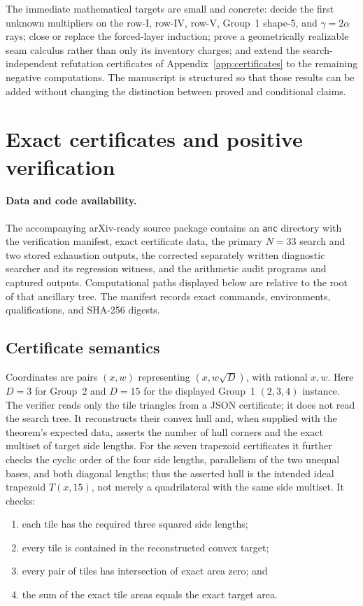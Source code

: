\documentclass[11pt]{amsart}
\theoremstyle{definition}
\theoremstyle{remark}
\newcommand{\pathcode}[1]{\nolinkurl{#1}}
\begin{document}
The immediate mathematical targets are small and concrete: decide the first
unknown multipliers on the row-I, row-IV, row-V, Group~1 shape-5, and
$\gamma=2\alpha$ rays; close or replace the forced-layer induction; prove a
geometrically realizable seam calculus rather than only its inventory
charges; and extend the search-independent refutation certificates of
Appendix~\ref{app:certificates} to the remaining negative computations.  The manuscript is structured so that those results can be
added without changing the distinction between proved and conditional claims.

\appendix

\section{Exact certificates and positive verification}\label{app:verification}
\paragraph{Data and code availability.}
The accompanying arXiv-ready source package contains an \pathcode{anc}
directory with the verification manifest, exact certificate data, the primary
$N=33$ search and two stored exhaustion outputs, the corrected separately
written diagnostic searcher and its regression witness, and the arithmetic
audit programs and captured outputs.  Computational paths displayed below
are relative to the root of that ancillary tree.  The manifest records exact
commands, environments, qualifications, and SHA-256 digests.

\subsection{Certificate semantics}\label{app:positive}

Coordinates are pairs $(x,w)$ representing $(x,w\sqrt D)$, with rational
$x,w$.  Here $D=3$ for Group~2 and $D=15$ for the displayed Group~1
$(2,3,4)$ instance.  The verifier reads only the tile triangles from a JSON
certificate; it does not read the search tree.  It reconstructs their convex
hull and, when supplied with the theorem's expected data, asserts the number
of hull corners and the exact multiset of target side lengths.  For the seven
trapezoid certificates it further checks the cyclic order of the four side
lengths, parallelism of the two unequal bases, and both diagonal lengths; thus
the asserted hull is the intended ideal trapezoid $T(x,15)$, not merely a
quadrilateral with the same side multiset.
It checks:
\begin{enumerate}[leftmargin=2.2em]
\item each tile has the required three squared side lengths;
\item every tile is contained in the reconstructed convex target;
\item every pair of tiles has intersection of exact area zero; and
\item the sum of the exact tile areas equals the exact target area.
\end{enumerate}
\end{document}

